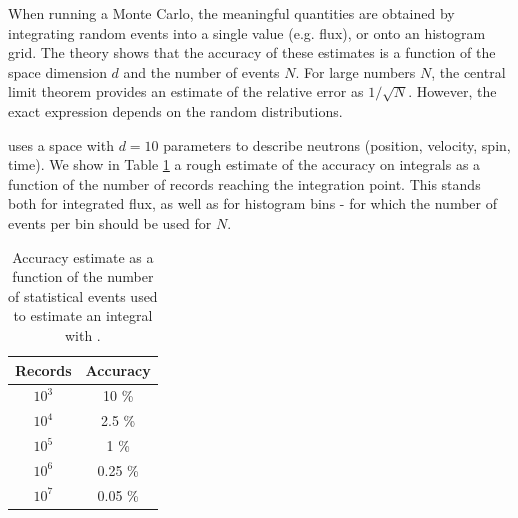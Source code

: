 When running a Monte Carlo, the meaningful quantities are obtained by integrating random events into a single value (e.g. flux), or onto an histogram grid. The theory \cite{James80} shows that the accuracy of these estimates is a function of the space dimension $d$ and the number of events $N$. For large numbers $N$, the central limit theorem provides an estimate of the relative error as $1/\sqrt{N}$. However, the exact expression depends on the random distributions.

\MCS uses a space with $d=10$ parameters to describe neutrons (position, velocity, spin, time). We show in Table \ref{t:mc_accuracy} a rough estimate of the accuracy on integrals as a function of the number of records reaching the integration point. This stands both for integrated flux, as well as for histogram bins - for which the number of events per bin should be used for $N$.

\begin{table}
  \begin{center}
  {\let\my=\\
    \begin{tabular}{|c|c|}
    \hline
    Records       & Accuracy \\
    \hline
    $10^3$ & 10 \% \\
    $10^4$ & 2.5 \% \\
    $10^5$ & 1 \% \\
    $10^6$ & 0.25 \% \\
    $10^7$ & 0.05 \% \\
    \hline
    \end{tabular}
    \caption{Accuracy estimate as a function of the number of statistical events used to estimate an integral with \MCS.}
    \label{t:mc_accuracy}
  }
  \end{center}
\end{table}

